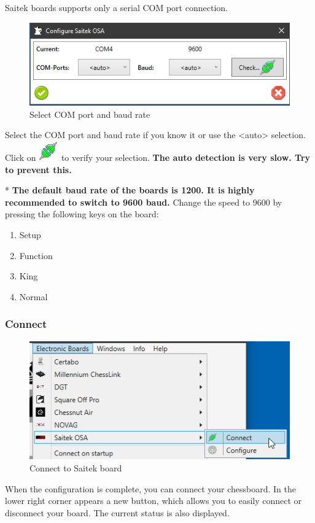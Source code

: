 \documentclass[11pt,a4paper]{article}
\begin{document}
Saitek boards supports only a serial COM port connection.

\begin{figure}[H]
	\centering
	\includegraphics[scale=0.9]{Saitek2.png}
	\caption{Select COM port and baud rate}
	\label{fig:Saitek2}
\end{figure}

Select the COM port and baud rate if you know it or use the <auto> selection. 
Click on \includegraphics[scale=0.5]{connect.png} to verify your selection. \textbf{The auto detection is very slow. Try to prevent this.}

{\color{red}*} \textbf{The default baud rate of the boards is 1200. It is highly recommended to switch to 9600 baud.} Change the speed to 9600 by pressing the following keys on the board:

\begin{enumerate}
	\item {\color{blue}Setup}
 	\item {\color{blue}Function}
	\item {\color{blue}King}
	\item {\color{blue}Normal}
\end{enumerate}

\subsubsection{Connect}
\begin{figure}[H]
	\centering
	\includegraphics[scale=1.0]{Saitek3.png}
	\caption{Connect to Saitek board}
	\label{fig:Saitek3}
\end{figure}
When the configuration is complete, you can connect your chessboard.
In the lower right corner appears a new button, which allows you to easily connect or disconnect your board. The current status is also displayed.
\end{document}
